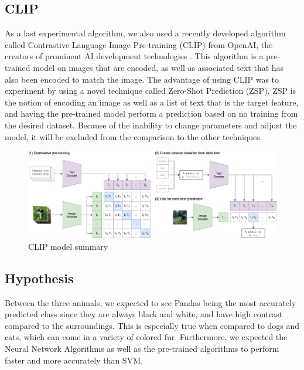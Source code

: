 \subsection{CLIP}
As a last experimental algorithm, we also used a recently developed algorithm called Contrastive Language-Image Pre-training (CLIP) from OpenAI, the creators of prominent AI development technologies \cite{CLIP}.
This algorithm is a pre-trained model on images that are encoded, as well as associated text that has also been encoded to match the image.
The advantage of using CLIP was to experiment by using a novel technique called Zero-Shot Prediction (ZSP).
ZSP is the notion of encoding an image as well as a list of text that is the target feature, and having the pre-trained model perform a prediction based on no training from the desired dataset.
Because of the inability to change parameters and adjust the model, it will be excluded from the comparison to the other techniques.

\begin{figure}[h]
	\centering
	\includegraphics[scale=0.5]{CLIP_structure}
	\caption{CLIP model summary}
	\label{fig:figure3}
\end{figure}

\subsection{Hypothesis}
Between the three animals, we expected to see Pandas being the most accurately predicted class since they are always black and white, and have high contrast compared to the surroundings.
This is especially true when compared to dogs and cats, which can come in a variety of colored fur.
Furthermore, we expected the Neural Network Algorithms as well as the pre-trained algorithms to perform faster and more accurately than SVM.